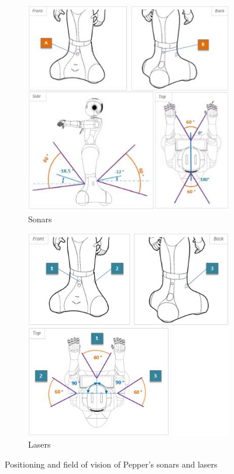 \begin{figure}[H]
\centering
\begin{subfigure}{.48\textwidth}
  \centering
  \includegraphics[width=\linewidth]{Figures/Pepper_Robot/sonars.jpg}
  \caption{Sonars}
  \label{fig:sonars}
\end{subfigure}\hspace*{\fill}
\begin{subfigure}{.48\textwidth}
  \centering
  \includegraphics[width=\linewidth]{Figures/Pepper_Robot/lasers.jpg}
  \caption{Lasers}
  \label{fig:lasers}
\end{subfigure}
\caption{Positioning and field of vision of Pepper's sonars and lasers}
\label{fig:sonars_lasers}
\end{figure}

